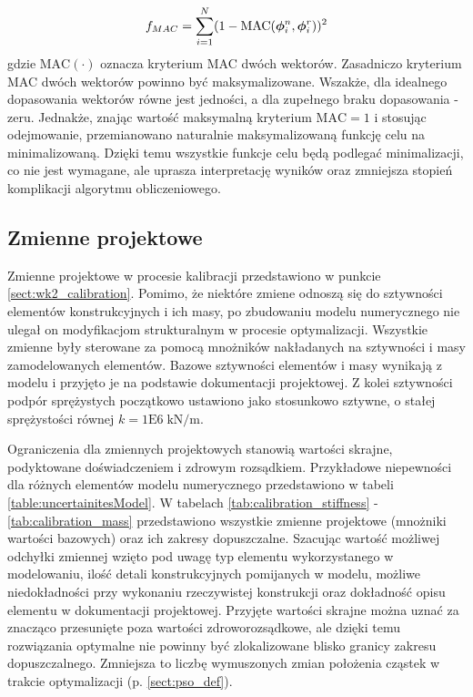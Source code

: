 \begin{equation} \label{eq:wk2_calib_f_mass}
	f_{MAC}=\sum_{i=1}^{N} (1-\text{MAC}(\bm{\phi}_i^n, \bm{\phi}_i^r))^2
\end{equation}
gdzie $\text{MAC}(\cdot)$ oznacza kryterium MAC dwóch wektorów. Zasadniczo kryterium MAC dwóch wektorów powinno być maksymalizowane. Wszakże, dla idealnego dopasowania wektorów równe jest jedności, a dla zupełnego braku dopasowania - zeru. Jednakże, znając wartość maksymalną kryterium $\text{MAC}=1$ i stosując odejmowanie, przemianowano naturalnie maksymalizowaną funkcję celu na minimalizowaną. Dzięki temu wszystkie funkcje celu będą podlegać minimalizacji, co nie jest wymagane, ale uprasza interpretację wyników oraz zmniejsza stopień komplikacji algorytmu obliczeniowego.

\subsection{Zmienne projektowe}
Zmienne projektowe w procesie kalibracji przedstawiono w punkcie \ref{sect:wk2_calibration}. Pomimo, że niektóre zmiene odnoszą się do sztywności elementów konstrukcyjnych i ich masy, po zbudowaniu modelu numerycznego nie ulegał on modyfikacjom strukturalnym w procesie optymalizacji. Wszystkie zmienne były sterowane za pomocą mnożników nakładanych na sztywności i masy zamodelowanych elementów. Bazowe sztywności elementów i masy wynikają z modelu i przyjęto je na podstawie dokumentacji projektowej. Z kolei sztywności podpór sprężystych początkowo ustawiono jako stosunkowo sztywne, o stałej sprężystości równej $k=1\text{E}6\;\text{kN/m}$. 

Ograniczenia dla zmiennych projektowych stanowią wartości skrajne, podyktowane doświadczeniem i zdrowym rozsądkiem. Przykładowe niepewności dla różnych elementów modelu numerycznego przedstawiono w tabeli \ref{table:uncertainitesModel}. W tabelach \ref{tab:calibration_stiffness} - \ref{tab:calibration_mass} przedstawiono wszystkie zmienne projektowe (mnożniki wartości bazowych) oraz ich zakresy dopuszczalne. Szacując wartość możliwej odchyłki zmiennej wzięto pod uwagę typ elementu wykorzystanego w modelowaniu, ilość detali konstrukcyjnych pomijanych w modelu, możliwe niedokładności przy wykonaniu rzeczywistej konstrukcji oraz dokładność opisu elementu w dokumentacji projektowej. Przyjęte wartości skrajne można uznać za znacząco przesunięte poza wartości zdroworozsądkowe, ale dzięki temu rozwiązania optymalne nie powinny być zlokalizowane blisko granicy zakresu dopuszczalnego. Zmniejsza to liczbę wymuszonych zmian położenia cząstek w trakcie optymalizacji (p. \ref{sect:pso_def}).

